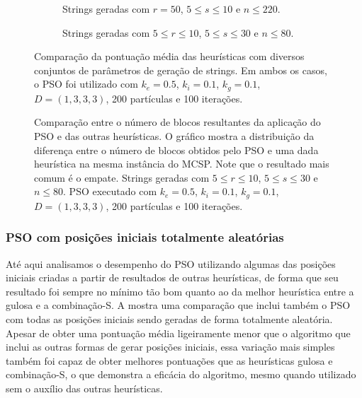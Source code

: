     \begin{figure}[hp]
        \centering
        \begin{subfigure}[b]{\textwidth}
            \centering
            \caption{Strings geradas com $r = 50$, $5 \leq s \leq 10$ e $n \leq 220$.}
            \vspace{12pt}
        \end{subfigure}

        \begin{subfigure}[b]{\textwidth}
            \centering

            \caption{Strings geradas com $5 \leq r \leq 10$, $5 \leq s \leq 30$ e $n \leq 80$.}
            \vspace{12pt}
        \end{subfigure}

        \caption{Comparação da pontuação média das heurísticas com diversos conjuntos de parâmetros de geração de strings. Em ambos os casos, o PSO foi utilizado com $k_e = 0.5$, $k_i = 0.1$, $k_g = 0.1$, $D = (1, 3, 3, 3)$, 200 partículas e 100 iterações.}
        \label{fig:comparacao-pontuacao}
    \end{figure}

    \begin{figure}[hbt]
        \centering

        \caption{Comparação entre o número de blocos resultantes da aplicação do PSO e das outras heurísticas. O gráfico mostra a distribuição da diferença entre o número de blocos obtidos pelo PSO e uma dada heurística na mesma instância do MCSP. Note que o resultado mais comum é o empate. Strings geradas com $5 \leq r \leq 10$, $5 \leq s \leq 30$ e $n \leq 80$. PSO executado com $k_e = 0.5$, $k_i = 0.1$, $k_g = 0.1$, $D = (1, 3, 3, 3)$, 200 partículas e 100 iterações.}
        \label{fig:pso-diff}
    \end{figure}

    \subsubsection{PSO com posições iniciais totalmente aleatórias}

        Até aqui analisamos o desempenho do PSO utilizando algumas das posições iniciais criadas a partir de resultados de outras heurísticas, de forma que seu resultado foi sempre no mínimo tão bom quanto ao da melhor heurística entre a gulosa e a combinação-S. A  mostra uma comparação que inclui também o PSO com todas as posições iniciais sendo geradas de forma totalmente aleatória. Apesar de obter uma pontuação média ligeiramente menor que o algoritmo que inclui as outras formas de gerar posições iniciais, essa variação mais simples também foi capaz de obter melhores pontuações que as heurísticas gulosa e combinação-S, o que demonstra a eficácia do algoritmo, mesmo quando {\color{red} utilizado sem o auxílio das outras heurísticas}.

